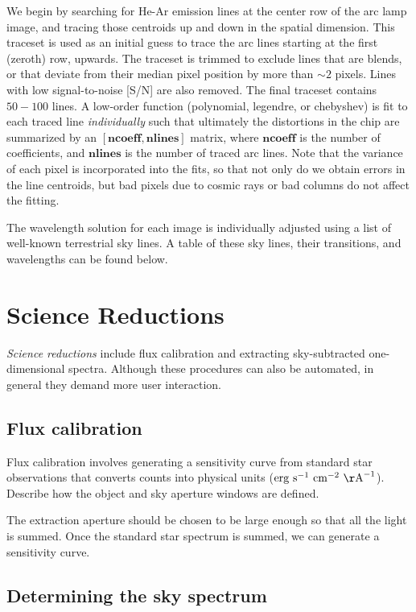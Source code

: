 \documentclass[12pt,preprint]{aastex}
\begin{document}
We begin by searching for He-Ar emission lines at the center row of
the arc lamp image, and tracing those centroids up and down in the
spatial dimension.  This traceset is used as an initial guess to trace
the arc lines starting at the first (zeroth) row, upwards.  The
traceset is trimmed to exclude lines that are blends, or that deviate
from their median pixel position by more than $\sim2$ pixels.  Lines
with low signal-to-noise [S/N] are also removed.  The final traceset
contains $50-100$ lines.  A low-order function (polynomial, legendre,
or chebyshev) is fit to each traced line \emph{individually} such that
ultimately the distortions in the chip are summarized by an
$[{\mathbf{ncoeff}},{\mathbf{nlines}}]$ matrix, where
${\mathbf{ncoeff}}$ is the number of coefficients, and
${\mathbf{nlines}}$ is the number of traced arc lines.  Note that the
variance of each pixel is incorporated into the fits, so that not only
do we obtain errors in the line centroids, but bad pixels due to
cosmic rays or bad columns do not affect the fitting.

The wavelength solution for each image is individually adjusted using
a list of well-known terrestrial sky lines.  A table of these sky
lines, their transitions, and wavelengths can be found below.

\section{Science Reductions}

{\em Science reductions} include flux calibration and extracting
sky-subtracted one-dimensional spectra.  Although these procedures can
also be automated, in general they demand more user interaction.

\subsection{Flux calibration}

Flux calibration involves generating a sensitivity curve from standard
star observations that converts counts into physical units (${\rm erg\
s}^{-1}\ {\rm cm}^{-2}\ {\rm \AA}^{-1}$).  Describe how the object and
sky aperture windows are defined.

The extraction aperture should be chosen to be large enough so that
all the light is summed.  Once the standard star spectrum is summed,
we can generate a sensitivity curve.

\subsection{Determining the sky spectrum}
\end{document}
